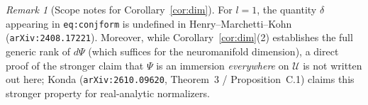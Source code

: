 \documentclass[11pt]{article}
\theoremstyle{plain}
\theoremstyle{definition}
\theoremstyle{remark}
\newtheorem{remark}{Remark}
\newcommand{\calU}{\mathcal{U}}
\begin{document}
\begin{remark}[Scope notes for Corollary~\ref{cor:dim}]
For $l = 1$, the quantity $\delta$ appearing in \texttt{eq:conjform} is undefined in Henry--Marchetti--Kohn (\texttt{arXiv:2408.17221}). Moreover, while Corollary~\ref{cor:dim}(2) establishes the full generic rank of $d\Psi$ (which suffices for the neuromanifold dimension), a direct proof of the stronger claim that $\Psi$ is an immersion \emph{everywhere} on $\calU$ is not written out here; Konda (\texttt{arXiv:2610.09620}, Theorem~3 / Proposition~C.1) claims this stronger property for real-analytic normalizers.
\end{remark}
\end{document}
